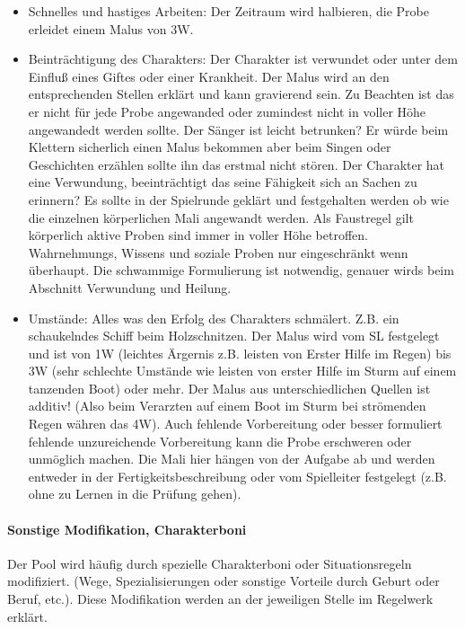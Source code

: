 \documentclass{article}
\begin{document}
\begin{itemize}
\item Schnelles und hastiges Arbeiten: Der Zeitraum wird halbieren, die Probe erleidet einem Malus von 3W.
\item Beinträchtigung des Charakters: Der Charakter ist verwundet oder unter dem Einfluß eines Giftes oder einer Krankheit. Der Malus wird an den entsprechenden Stellen erklärt und kann gravierend sein. Zu Beachten ist das er nicht für jede Probe angewanded oder zumindest nicht in voller Höhe angewandedt werden sollte. Der Sänger ist leicht betrunken? Er würde beim Klettern sicherlich einen Malus bekommen aber beim Singen oder Geschichten erzählen sollte ihn das erstmal nicht stören. Der Charakter hat eine Verwundung, beeinträchtigt das seine Fähigkeit sich an Sachen zu erinnern? Es sollte in der Spielrunde geklärt und festgehalten werden ob wie die einzelnen körperlichen Mali angewandt werden. Als Faustregel gilt körperlich aktive Proben sind immer in voller Höhe betroffen. Wahrnehmungs, Wissens und soziale Proben nur eingeschränkt wenn überhaupt. Die schwammige Formulierung ist notwendig, genauer wirds beim Abschnitt Verwundung und Heilung.
\item Umstände: Alles was den Erfolg des Charakters schmälert. Z.B. ein schaukelndes Schiff beim Holzschnitzen. Der Malus wird vom SL festgelegt und ist von 1W (leichtes Ärgernis z.B. leisten von Erster Hilfe im Regen) bis 3W (sehr schlechte Umstände wie leisten von erster Hilfe im Sturm auf einem tanzenden Boot) oder mehr. Der Malus aus unterschiedlichen Quellen ist additiv! (Also beim Verarzten auf einem Boot im Sturm bei strömenden Regen währen das 4W). Auch fehlende Vorbereitung oder besser formuliert fehlende unzureichende Vorbereitung kann die Probe erschweren oder unmöglich machen. Die Mali hier hängen von der Aufgabe ab und werden entweder in der Fertigkeitsbeschreibung oder vom Spielleiter festgelegt (z.B. ohne zu Lernen in die Prüfung gehen).
\end{itemize}

\paragraph{Sonstige Modifikation, Charakterboni}

Der Pool wird häufig durch spezielle Charakterboni oder Situationsregeln modifiziert. (Wege, Spezialisierungen oder
sonstige Vorteile durch Geburt oder Beruf, etc.). Diese Modifikation werden an der jeweiligen Stelle im Regelwerk
erklärt.
\end{document}
